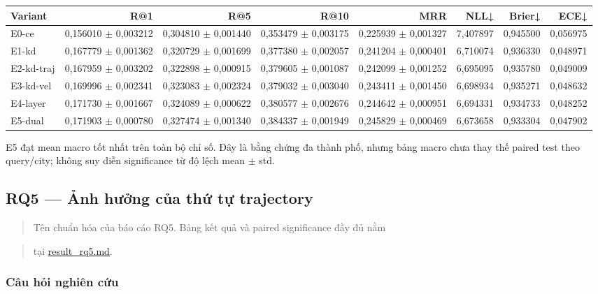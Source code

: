 \begin{table}[!htbp]
\centering
\scriptsize
\setlength{\tabcolsep}{2.5pt}
\begin{adjustbox}{max width=\textwidth}
\begin{tabular}{@{}lrrrrrrr@{}}
\toprule
Variant & R@1 & R@5 & R@10 & MRR & NLL↓ & Brier↓ & ECE↓ \\
\midrule
E0-ce & 0,156010 $\pm$ 0,003212 & 0,304810 $\pm$ 0,001440 & 0,353479 $\pm$ 0,003175 & 0,225939 $\pm$ 0,001327 & 7,407897 & 0,945500 & 0,056975 \\
E1-kd & 0,167779 $\pm$ 0,001362 & 0,320729 $\pm$ 0,001699 & 0,377380 $\pm$ 0,002057 & 0,241204 $\pm$ 0,000401 & 6,710074 & 0,936330 & 0,048971 \\
E2-kd-traj & 0,167959 $\pm$ 0,003202 & 0,322898 $\pm$ 0,000915 & 0,379605 $\pm$ 0,001087 & 0,242099 $\pm$ 0,001252 & 6,695095 & 0,935780 & 0,049009 \\
E3-kd-vel & 0,169996 $\pm$ 0,002341 & 0,323083 $\pm$ 0,002324 & 0,379032 $\pm$ 0,003040 & 0,243411 $\pm$ 0,001450 & 6,698934 & 0,935271 & 0,048632 \\
E4-layer & 0,171730 $\pm$ 0,001667 & 0,324089 $\pm$ 0,000622 & 0,380577 $\pm$ 0,002676 & 0,244642 $\pm$ 0,000951 & 6,694331 & 0,934733 & 0,048252 \\
E5-dual & 0,171903 $\pm$ 0,000780 & 0,327474 $\pm$ 0,001340 & 0,384337 $\pm$ 0,001949 & 0,245829 $\pm$ 0,000469 & 6,673658 & 0,933304 & 0,047902 \\
\bottomrule
\end{tabular}
\end{adjustbox}
\end{table}

E5 đạt mean macro tốt nhất trên toàn bộ chỉ số. Đây là bằng chứng đa thành phố, nhưng bảng macro chưa thay thế paired test theo query/city; không suy diễn significance từ độ lệch mean $\pm$ std.


\subsection{RQ5 --- Ảnh hưởng của thứ tự trajectory}

\begin{quote}\small Tên chuẩn hóa của báo cáo RQ5. Bảng kết quả và paired significance đầy đủ nằm\end{quote}
\begin{quote}\small tại \href{result\_rq5.md}{result\_rq5.md}.\end{quote}
\subsubsection*{Câu hỏi nghiên cứu}

